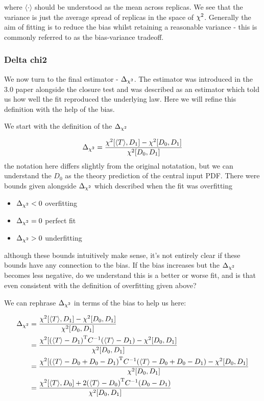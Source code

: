 where $\langle \cdot \rangle$ should be understood as the mean across replicas. We see
that the variance is just the average spread of replicas in the space of $\chi^{2}$.
Generally the aim of fitting is to reduce the bias whilst retaining a reasonable
variance - this is commonly referred to as the bias-variance tradeoff.

\subsubsection*{Delta chi2}

We now turn to the final estimator - $\Delta_{\chi^{2}}$. The estimator was introduced in the
3.0 paper alongside the closure test and was described as an estimator which told
us how well the fit reproduced the underlying law. Here we will refine this definition
with the help of the bias.

We start with the definition of the $\Delta_{\chi^{2}}$

\begin{equation}
    \Delta_{\chi^{2}} = \frac{\chi^{2}[\langle T \rangle, D_{1}] - \chi^{2}[D_{0}, D_{1}]}{\chi^{2}[D_{0}, D_{1}]}
\end{equation}
the notation here differs slightly from the original notatation, but we can understand
the $D_{0}$ as the theory prediction of the central input PDF. There were bounds given alongside
$\Delta_{\chi^{2}}$ which described when the fit was overfitting

\begin{itemize}
    \item $\Delta_{\chi^{2}} < 0$ overfitting
    \item $\Delta_{\chi^{2}} = 0$ perfect fit
    \item $\Delta_{\chi^{2}} > 0$ underfitting 
\end{itemize}

although these bounds intuitively make sense, it's not entirely clear if these
bounds have any connection to the bias. If the bias increases but the $\Delta_{\chi^{2}}$ becomes
less negative, do we understand this is a better or worse fit, and is that even consistent
with the definition of overfitting given above?

We can rephrase $\Delta_{\chi^{2}}$ in terms of the bias to help us here:

\begin{equation}
    \begin{split}
        \Delta_{\chi^{2}} &= \frac{\chi^{2}[\langle T \rangle, D_{1}] - \chi^{2}[D_{0}, D_{1}]}{\chi^{2}[D_{0}, D_{1}]} \\
        &= \frac{\chi^{2}[{(\langle T \rangle - D_{1})}^{\mathrm{T}} C^{-1} (\langle T \rangle - D_{1}) - \chi^{2}[D_{0}, D_{1}]}{\chi^{2}[D_{0}, D_{1}]} \\
        &= \frac{\chi^{2}[{(\langle T \rangle - D_{0} + D_{0} - D_{1})}^{\mathrm{T}} C^{-1} (\langle T \rangle - D_{0} + D_{0} -D_{1}) - \chi^{2}[D_{0}, D_{1}]}{\chi^{2}[D_{0}, D_{1}]} \\
        &= \frac{ \chi^{2}[\langle T \rangle, D_{0}] + 2 {(\langle T \rangle - D_{0})}^{\mathrm{T}} C^{-1} (D_{0} - D_{1}) }{\chi^{2}[D_{0}, D_{1}]}
    \end{split}
    \label{eq: deltachi2tobias}
\end{equation}

